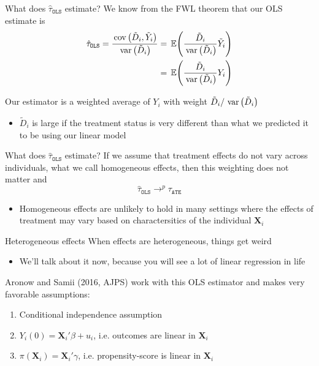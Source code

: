 \documentclass[aspectratio=169,t,11pt,table]{beamer}
\begin{document}
\begin{frame}{What does $\hat{\tau}_{\texttt{OLS}}$ estimate?}
  We know from the FWL theorem that our OLS estimate is 
  \begin{align*}
    \hat{\tau}_{\texttt{OLS}} 
    = \frac{\cov{\tilde{D}_i, \tilde{Y}_i}}{\var{\tilde{D}_i}} 
    &= \expec{\frac{\tilde{D}_i}{\var{\tilde{D}_i}} \tilde{Y}_i} \\
    &= \expec{\frac{\tilde{D}_i}{\var{\tilde{D}_i}} Y_i}
  \end{align*}
  
  \pause
  Our estimator is a weighted average of $Y_i$ with weight $\tilde{D}_i / \var{\tilde{D}_i}$
  \begin{itemize}
    \item $\tilde{D}_i$ is large if the treatment status is very different than what we predicted it to be using our linear model
  \end{itemize}
\end{frame}

\begin{frame}{What does $\hat{\tau}_{\texttt{OLS}}$ estimate?}
  If we assume that treatment effects do not vary across individuals, what we call \alert{homogeneous effects}, then this weighting does not matter and 
  $$
    \hat{\tau}_{\texttt{OLS}} \to^p \tau_{\texttt{ATE}}
  $$
  \pause
  \begin{itemize}
    \item Homogeneous effects are unlikely to hold in many settings where the effects of treatment may vary based on charactersitics of the individual $\bm{X}_i$  
  \end{itemize}
\end{frame}

\begin{frame}{Heterogeneous effects}
  When effects are heterogeneous, things get weird
  \begin{itemize}
    \item We'll talk about it now, because you will see a lot of linear regression in life
  \end{itemize}

  \bigskip
  \pause
  Aronow and Samii (2016, AJPS) work with this OLS estimator and makes very favorable assumptions:
  \begin{enumerate}
    \item Conditional independence assumption
    
    \item $Y_i(0) = \bm{X}_i' \beta + u_i$, i.e. outcomes are linear in $\bm{X}_i$
    
    \item $\pi(\bm{X}_i) = \bm{X}_i' \gamma$, i.e. propensity-score is linear in $\bm{X}_i$
  \end{enumerate}
\end{frame}
\end{document}
